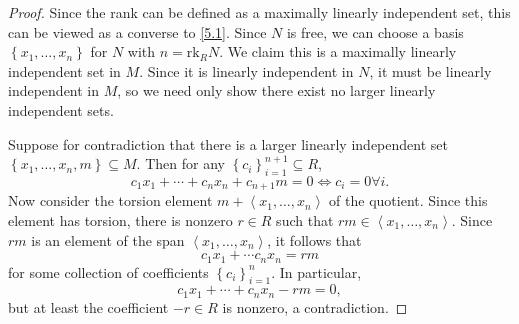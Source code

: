 \documentclass[11pt, letterpaper]{article}
\begin{document}
\begin{proof}
	Since the rank can be defined as a maximally linearly independent set, this can be viewed as a converse to \cref{5.1}. Since $N$ is free, we can choose a basis $\left\{ x_1, \ldots ,x_n \right\} $ for $N$ with $n=\mathrm{rk} _RN$. We claim this is a maximally linearly independent set in $M$. Since it is linearly independent in $N$, it must be linearly independent in $M$, so we need only show there exist no larger linearly independent sets.

	Suppose for contradiction that there is a larger linearly independent set $\left\{ x_1, \ldots ,x_n,m \right\} \subseteq M$. Then for any $\left\{ c_i \right\}_{i=1} ^{n+1} \subseteq R$,
	\[
		c_1x_1 + \cdots + c_nx_n + c_{n+1} m = 0 \iff c_i=0\forall i
	.\]
	Now consider the torsion element $m+\left\langle x_1, \ldots ,x_n \right\rangle $ of the quotient. Since this element has torsion, there is nonzero $r\in R $ such that $r m\in \left\langle x_1, \ldots ,x_n \right\rangle $. Since $r m$ is an element of the span $\left\langle x_1, \ldots ,x_n \right\rangle $, it follows that
	\[
		c_1x_1 + \cdots c_nx_n = r m 
	\]
	for some collection of coefficients $\left\{ c_i \right\}_{i=1} ^n$. In particular,
	\[
		c_1x_1 + \cdots + c_nx_n - r m=0,
	\]
	but at least the coefficient $-r\in R$ is nonzero, a contradiction.
\end{proof}
\end{document}
